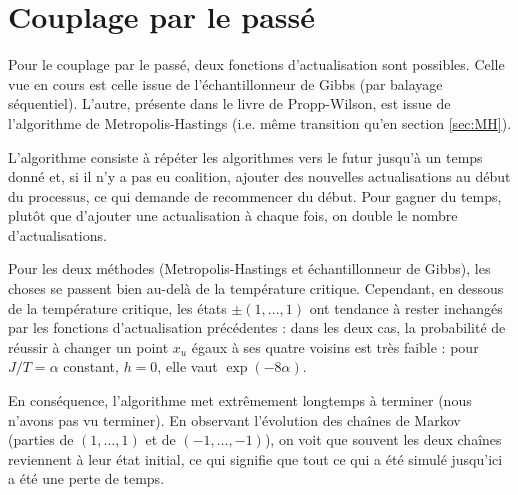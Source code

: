 \documentclass[a4paper,11pt]{article}
\begin{document}
\section{Couplage par le passé}

Pour le couplage par le passé, deux fonctions d'actualisation sont possibles. Celle vue en cours est celle issue de l'échantillonneur de Gibbs (par balayage séquentiel). L'autre, présente dans le livre de Propp-Wilson, est issue de l'algorithme de Metropolis-Hastings (i.e. même transition qu'en section \ref{sec:MH}).

L'algorithme consiste à répéter les algorithmes vers le futur jusqu'à un temps donné et, si il n'y a pas eu coalition, ajouter des nouvelles actualisations au début du processus, ce qui demande de recommencer du début. Pour gagner du temps, plutôt que d'ajouter une actualisation à chaque fois, on double le nombre d'actualisations.

Pour les deux méthodes (Metropolis-Hastings et échantillonneur de Gibbs), les choses se passent bien au-delà de la température critique. Cependant, en dessous de la température critique, les états $\pm(1,\hdots,1)$ ont tendance à rester inchangés par les fonctions d'actualisation précédentes : dans les deux cas, la probabilité de réussir à changer un point $x_u$ égaux à ses quatre voisins est très faible : pour $J/T = \alpha$ constant, $h = 0$, elle vaut $\exp(-8 \alpha)$.

En conséquence, l'algorithme met extrêmement longtemps à terminer (nous n'avons pas vu terminer). En observant l'évolution des chaînes de Markov (parties de $(1,\hdots,1)$ et de $(-1,\hdots,-1)$), on voit que souvent les deux chaînes reviennent à leur état initial, ce qui signifie que tout ce qui a été simulé jusqu'ici a été une perte de temps.
\end{document}
